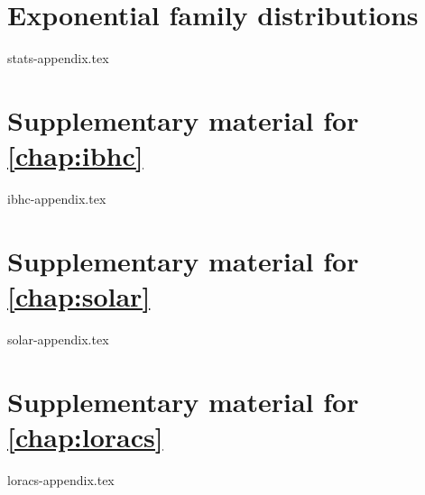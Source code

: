 \chapter{Exponential family distributions}
\label{chap:stats-appendix}
{stats-appendix.tex}

\chapter{Supplementary material for \autoref{chap:ibhc}}
\label{chap:ibhc-appendix}
{ibhc-appendix.tex}

\chapter{Supplementary material for \autoref{chap:solar}}
\label{chap:solar-appendix}
{solar-appendix.tex}

\chapter{Supplementary material for \autoref{chap:loracs}}
\label{chap:loracs-appendix}
{loracs-appendix.tex}
